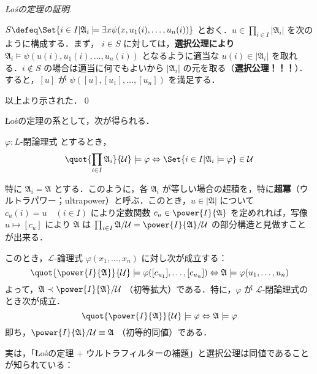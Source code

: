 \documentclass[a4j,xelatex,ja=standard]{ltjsarticle}
\newcommand{\Los}{{\L}o\'{s}}
\begin{document}
\begin{proof}[\Los の定理の証明]
\begin{enumerate}[label=(\roman{*})]
	$S \defeq \Set{i \in I | \mathfrak{A}_i \models \exists x \psi(x, u_1(i), \dots, u_n(i))}$
	とおく．$u \in \prod_{i \in I} |\mathfrak{A}_i|$ を次のように構成する．まず， $i \in S$ に対しては，{\bfseries 選択公理により} $\mathfrak{A}_i \models \psi(u(i), u_1(i), \dots, u_n(i))$ となるように適当な $u(i) \in |\mathfrak{A}_i|$ を取れる．$i\notin S$ の場合は適当に何でもよいから $|\mathfrak{A}_i|$ の元を取る（{\bfseries 選択公理！！！}）．すると，$[u]$ が $\psi([u], [u_1], \dots, [u_n])$ を満足する．
 \end{enumerate}
 以上より示された．\qed
\end{proof}

\Los の定理の系として，次が得られる．
\begin{corollary}
 $\varphi: L\text{-閉論理式}$ とするとき，
 \[
   \quot{\prod_{i \in I}\mathfrak{A}_i}{\mathcal{U}} \models \varphi \Leftrightarrow \Set{i \in I | \mathfrak{A}_i \models \varphi} \in \mathcal{U}
 \]
\end{corollary}
\begin{corollary}\label{los-power}
 特に $\mathfrak{A}_i = \mathfrak{A}$ とする．このように，各 $\mathfrak{A}_i$ が等しい場合の超積を，特に{\bfseries 超冪}（ウルトラパワー；ultrapower）と呼ぶ．このとき，$u \in |\mathfrak{A}|$ について $c_u(i) = u \quad (i \in I)$ により定数関数 $c_u \in \power{I}{\mathfrak{A}}$ を定めれれば，写像 $u \mapsto [c_u]$ により $\mathfrak{A}$ は $\prod_{i \in I} \mathfrak{A} / \mathcal{U} = \power{I}{\mathfrak{A}}/\mathcal{U}$ の部分構造と見做すことが出来る．

 このとき，$\mathcal{L}$-論理式 $\varphi(x_1, \dots, x_n)$ に対し次が成立する：
 \[
   \quot{\power{I}{\mathfrak{A}}}{\mathcal{U}} \models \varphi([c_{u_1}], \dots, [c_{u_n}]) \Leftrightarrow  \mathfrak{A} \models \varphi(u_1, \dots, u_n)
 \]
 よって，$\mathfrak{A} \prec \power{I}{\mathfrak{A}}/\mathcal{U}$ （初等拡大）である．特に，$\varphi$ が $\mathcal{L}$-閉論理式のとき次が成立．
 \[
   \quot{\power{I}{\mathfrak{A}}}{\mathcal{U}} \models \varphi \Leftrightarrow  \mathfrak{A} \models \varphi
 \]
 即ち，$\power{I}{\mathfrak{A}}/\mathcal{U} \equiv \mathfrak{A}$ （初等的同値）である．
\end{corollary}

実は，「\Los の定理 + ウルトラフィルターの補題」と選択公理は同値であることが知られている：
\end{document}
